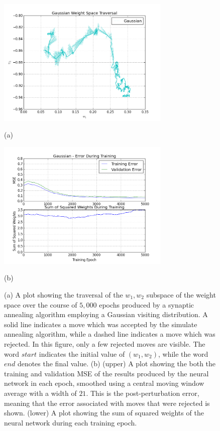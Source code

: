 \documentclass[11pt]{afthesis}
\begin{document}
	 	\begin{figure}[ht!]
	 		
	 		\begin{minipage}[b]{0.5\linewidth}
	 			\centering
	 			\centerline{\includegraphics[width = 3.25in]{figures/weight_space_gaussian.png}}
	 			\centerline{(a)}\medskip
	 		\end{minipage}
	 		\hfill
	 		\begin{minipage}[b]{0.5\linewidth}
	 			\centering
	 			\centerline{\includegraphics[width = 3.25in]{figures/weight_space_gaussian_perf.png}}
	 			\centerline{(b)}\medskip
	 		\end{minipage}
	 		\caption{
	 			(a) A plot showing the traversal of the $w_1,w_2$ subspace of the weight space over the course of $5,000$ epochs produced by a synaptic annealing algorithm employing a Gaussian visiting distribution. A solid line indicates a move which was accepted by the simulate annealing algorithm, while a dashed line indicates a move which was rejected. In this figure, only a few rejected moves are visible. The word $start$ indicates the initial value of $(w_1,w_2)$, while the word $end$ denotes the final value. 
	 			(b) (upper) A plot showing the both the training and validation MSE of the results produced by the neural network in each epoch, smoothed using a central moving window average with a width of $21$. This is the post-perturbation error, meaning that the error associated with moves that were rejected is shown. (lower) A plot showing the sum of squared weights of the neural network during each training epoch.}
	 		\label{fig:weight_space_gaussian}
	 		
	 	\end{figure}
	 	
\end{document}
